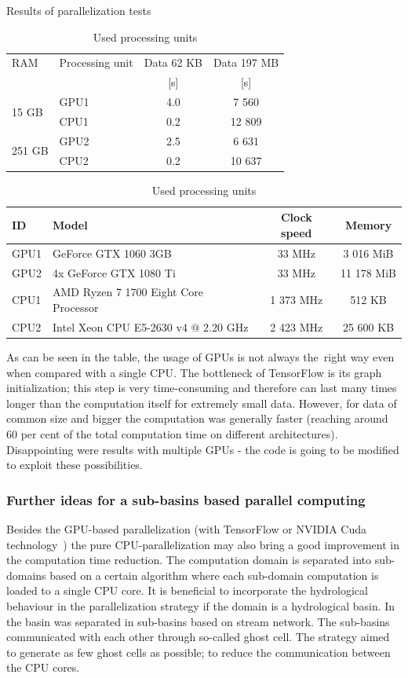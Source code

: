 \begin{table}[h]
  \centering
  \caption{Results of parallelization tests}
  \makegapedcells
  \begin{tabular}{|l|p{2.2cm}|c|c|}\hline
    RAM & Processing unit & Data 62 KB & Data 197 MB\\
     & & [s] & [s]\\\hline
    \multirow{2}{*}{15 GB} & GPU1 & 4.0 & 7 560\\
    & CPU1 & 0.2 & 12 809\\\hline
    \multirow{2}{*}{251 GB} & GPU2 & 2.5 & 6 631\\
    & CPU2 & 0.2 & 10 637\\\hline
  \end{tabular}
  \label{tab:GPU_results}
  \caption{Used processing units}
  \begin{tabular}{|l|p{1.9cm}|c|c|}\hline
    ID & Model & Clock speed & Memory\\\hline
    GPU1 & GeForce GTX 1060 3GB & 33 MHz & 3 016 MiB \\\hline
    GPU2 & 4x GeForce GTX 1080 Ti & 33 MHz & 11 178 MiB \\\hline
    CPU1 & AMD Ryzen 7 1700 Eight Core Processor & 1 373 MHz & 512 KB \\\hline
    CPU2 & Intel Xeon CPU E5-2630 v4 @ 2.20 GHz & 2 423 MHz & 25 600 KB \\\hline
  \end{tabular}
\end{table}

As can be seen in the table, the usage of GPUs is not always
the~right way even when compared with a single CPU.
The bottleneck of TensorFlow is its graph initialization; this step is very
time-consuming and therefore can last many times longer than the computation
itself for extremely small data. However, for data of common size and bigger
the computation was generally faster (reaching around 60 per cent of the total
computation time on different architectures). Disappointing were results with
multiple GPUs - the code is going to be modified to exploit these
possibilities.

\subsubsection{Further ideas for a sub-basins based parallel computing}
Besides the GPU-based parallelization (with TensorFlow \cite{tensorflow2015-whitepaper} or
NVIDIA Cuda technology~\cite{Kalyanapu2011,Le2015}) the
pure CPU-parallelization may also bring a good improvement in the computation
time reduction. The computation domain is separated into sub-domains
based on a certain algorithm where each sub-domain computation is loaded to a single
CPU core.  It is beneficial to incorporate the
hydrological behaviour in the parallelization
strategy if the domain is a hydrological basin. 
In~\cite{Vivoni2011} the basin was separated in sub-basins
based on stream network. The sub-basins communicated with each other through so-called
ghost cell. The strategy aimed to generate as few ghost cells as
possible; to reduce the communication between the CPU cores. 

